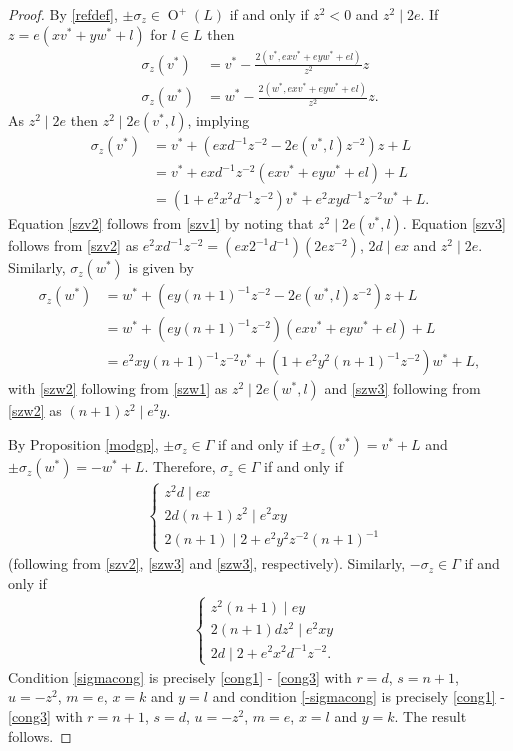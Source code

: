 \documentclass[12pt, a4paper]{article}
\newcommand{\opn}{\operatorname}
\begin{document}
\begin{proof}
By \eqref{refdef}, $\pm \sigma_z \in \opn{O}^+(L)$ if and only if $z^2<0$ and $z^2 \mid 2e$.
  If $z = e(xv^* + yw^* + l)$ for $l \in L$ then 
\begin{align*}
    \sigma_z(v^*)  & = v^* - \frac{2(v^*, exv^* + eyw^* + el)}{z^2}z  \\
    \sigma_z(w^*)  & = w^* - \frac{2(w^*, exv^* + eyw^* + el)}{z^2}z. 
  \end{align*}
  As $z^2 \mid 2e$ then $z^2 \mid 2e(v^*, l)$, implying 
\begin{align}
    \sigma_z(v^*) & = v^* + (exd^{-1}z^{-2} - 2e(v^*, l)z^{-2})z + L \label{szv1} \\ 
    & = v^* + exd^{-1}z^{-2}(exv^* + eyw^* + el) + L \label{szv2} \\
    & = (1+ e^2x^2d^{-1}z^{-2})v^* + e^2xyd^{-1}z^{-2} w^* + L. \label{szv3} 
  \end{align}
  Equation \eqref{szv2} follows from \eqref{szv1} by noting that $z^2 \mid 2e(v^*, l)$.
  Equation \eqref{szv3} follows from \eqref{szv2} as $e^2x d^{-1}z^{-2}= (ex 2^{-1}d^{-1})(2ez^{-2})$, $2d \mid ex$ and $z^2 \mid 2e$.
  Similarly, $\sigma_z(w^*)$ is given by
\begin{align}
\sigma_z(w^*) & = w^* + (ey(n+1)^{-1}z^{-2} - 2e(w^*, l)z^{-2})z + L \label{szw1}\\
              & = w^* + (ey(n+1)^{-1}z^{-2})(exv^* + eyw^* + el) + L \label{szw2}\\
              & = e^2xy(n+1)^{-1}z^{-2}v^* + (1 + e^2y^2(n+1)^{-1}z^{-2})w^* + L, \label{szw3}
\end{align}
with \eqref{szw2} following from \eqref{szw1} as $z^2 \mid 2e(w^*, l)$ and \eqref{szw3} following from \eqref{szw2} as $(n+1)z^2 \mid e^2y$.

By Proposition \ref{modgp}, $\pm \sigma_z \in \Gamma$ if and only if $\pm \sigma_z(v^*) = v^* + L$ and $\pm \sigma_z(w^*) = -w^* + L$.
Therefore, $\sigma_z \in \Gamma$ if and only if
\begin{align}\label{sigmacong}
&
\begin{cases}
z^2 d \mid e x \\
2d(n+1)z^2 \mid e^2 x y \\
2(n+1) \mid 2 + e^2 y^2 z^{-2}(n+1)^{-1} 
\end{cases}
\end{align}
(following from \eqref{szv2}, \eqref{szw3} and \eqref{szw3}, respectively).
Similarly, $-\sigma_z \in \Gamma$ if and only if
\begin{align}\label{-sigmacong}
&
\begin{cases}
z^2 (n+1) \mid e y \\
2(n+1) d z^2 \mid e^2 x y\\
2d \mid 2 + e^2 x^2 d^{-1} z^{-2}.
\end{cases}
\end{align}
Condition \eqref{sigmacong} is precisely \eqref{cong1} - \eqref{cong3} with $r=d$, $s=n+1$, $u=-z^2$, $m=e$, $x=k$ and $y=l$ and condition \eqref{-sigmacong} is precisely \eqref{cong1} - \eqref{cong3} with $r=n+1$, $s=d$, $u=-z^2$, $m=e$, $x=l$ and $y=k$.
The result follows.
\end{proof}
\end{document}

